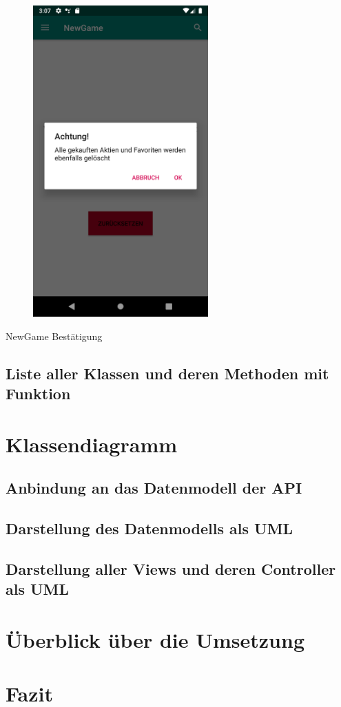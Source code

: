 \documentclass[10pt]{scrartcl}
\begin{document}
\begin{figure}[H]
	\centering
	\includegraphics[width=0.6\textwidth]{Bilder/Applikation/NewGameBestaetigung.png}
\end{figure}
NewGame Bestätigung

\subsection{Liste aller Klassen und deren Methoden mit Funktion}

\section{Klassendiagramm}

\subsection{Anbindung an das Datenmodell der API}

\subsection{Darstellung des Datenmodells als UML}

\subsection{Darstellung aller Views und deren Controller als UML}

\section{Überblick über die Umsetzung}

\section{Fazit}
\end{document}
